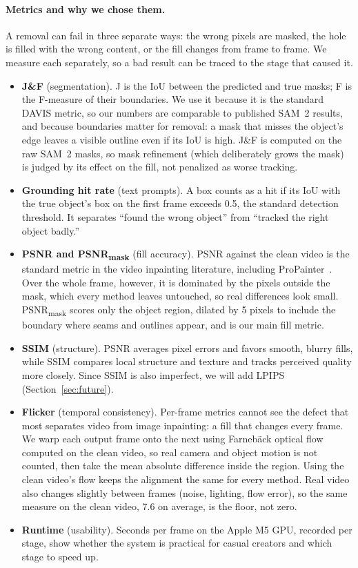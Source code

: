 \documentclass[11pt]{article}
\begin{document}
\paragraph{Metrics and why we chose them.} A removal can fail in three separate ways: the wrong pixels are masked, the hole is filled with the wrong content, or the fill changes from frame to frame. We measure each separately, so a bad result can be traced to the stage that caused it.
\begin{itemize}
  \item \textbf{J\&F} (segmentation). J is the IoU between the predicted and true masks; F is the F-measure of their boundaries. We use it because it is the standard DAVIS metric, so our numbers are comparable to published SAM~2 results, and because boundaries matter for removal: a mask that misses the object's edge leaves a visible outline even if its IoU is high. J\&F is computed on the raw SAM~2 masks, so mask refinement (which deliberately grows the mask) is judged by its effect on the fill, not penalized as worse tracking.
  \item \textbf{Grounding hit rate} (text prompts). A box counts as a hit if its IoU with the true object's box on the first frame exceeds 0.5, the standard detection threshold. It separates ``found the wrong object'' from ``tracked the right object badly.''
  \item \textbf{PSNR and PSNR\textsubscript{mask}} (fill accuracy). PSNR against the clean video is the standard metric in the video inpainting literature, including ProPainter~\cite{zhou2023propainter}. Over the whole frame, however, it is dominated by the pixels outside the mask, which every method leaves untouched, so real differences look small. PSNR\textsubscript{mask} scores only the object region, dilated by 5 pixels to include the boundary where seams and outlines appear, and is our main fill metric.
  \item \textbf{SSIM} (structure). PSNR averages pixel errors and favors smooth, blurry fills, while SSIM compares local structure and texture and tracks perceived quality more closely. Since SSIM is also imperfect, we will add LPIPS (Section~\ref{sec:future}).
  \item \textbf{Flicker} (temporal consistency). Per-frame metrics cannot see the defect that most separates video from image inpainting: a fill that changes every frame. We warp each output frame onto the next using Farneb\"ack optical flow~\cite{farneback2003} computed on the clean video, so real camera and object motion is not counted, then take the mean absolute difference inside the region. Using the clean video's flow keeps the alignment the same for every method. Real video also changes slightly between frames (noise, lighting, flow error), so the same measure on the clean video, 7.6 on average, is the floor, not zero.
  \item \textbf{Runtime} (usability). Seconds per frame on the Apple M5 GPU, recorded per stage, show whether the system is practical for casual creators and which stage to speed up.
\end{itemize}
\end{document}
